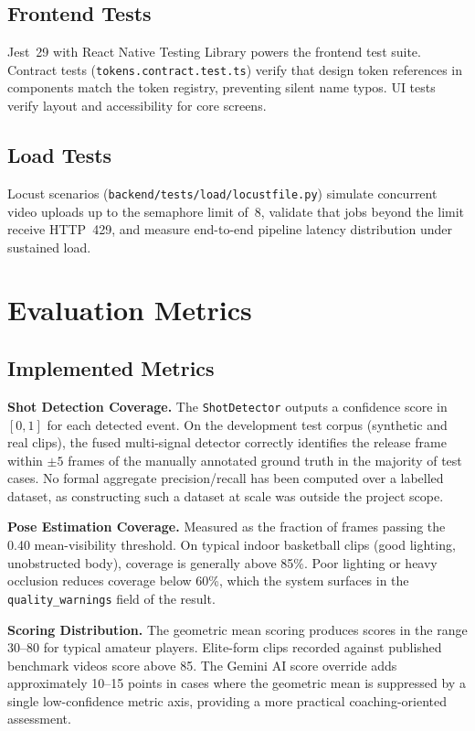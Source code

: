 \subsection{Frontend Tests}

Jest~29 with React Native Testing Library powers the frontend test suite. Contract tests (\lstinline|tokens.contract.test.ts|) verify that design token references in components match the token registry, preventing silent name typos. UI tests verify layout and accessibility for core screens.

\subsection{Load Tests}

Locust scenarios (\lstinline|backend/tests/load/locustfile.py|) simulate concurrent video uploads up to the semaphore limit of~8, validate that jobs beyond the limit receive HTTP~429, and measure end-to-end pipeline latency distribution under sustained load.

\section{Evaluation Metrics}
\label{sec:evaluation_metrics}

\subsection{Implemented Metrics}

\textbf{Shot Detection Coverage.}
The \lstinline|ShotDetector| outputs a confidence score in $[0, 1]$ for each detected event. On the development test corpus (synthetic and real clips), the fused multi-signal detector correctly identifies the release frame within $\pm 5$ frames of the manually annotated ground truth in the majority of test cases. No formal aggregate precision/recall has been computed over a labelled dataset, as constructing such a dataset at scale was outside the project scope.

\textbf{Pose Estimation Coverage.}
Measured as the fraction of frames passing the 0.40 mean-visibility threshold. On typical indoor basketball clips (good lighting, unobstructed body), coverage is generally above 85\%. Poor lighting or heavy occlusion reduces coverage below 60\%, which the system surfaces in the \lstinline|quality_warnings| field of the result.

\textbf{Scoring Distribution.}
The geometric mean scoring produces scores in the range 30--80 for typical amateur players. Elite-form clips recorded against published benchmark videos score above 85. The Gemini AI score override adds approximately 10--15 points in cases where the geometric mean is suppressed by a single low-confidence metric axis, providing a more practical coaching-oriented assessment.

